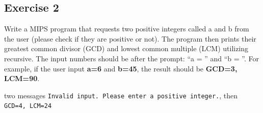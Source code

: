 \subsection{Exercise 2}
Write a MIPS program that requests two positive integers called a and b
from the user (please check if they are positive or not). The program then
prints their greatest common divisor (GCD) and lowest common multiple
(LCM) utilizing recursive. The input numbers should be after the prompt:
``a = '' and ``b = ''. For example, if the user input \textbf{a=6} and \textbf{b=45}, the result
should be \textbf{GCD=3, LCM=90}.

%
  {two messages \texttt{Invalid input. Please enter a positive integer.},
   then \texttt{GCD=4, LCM=24}}
